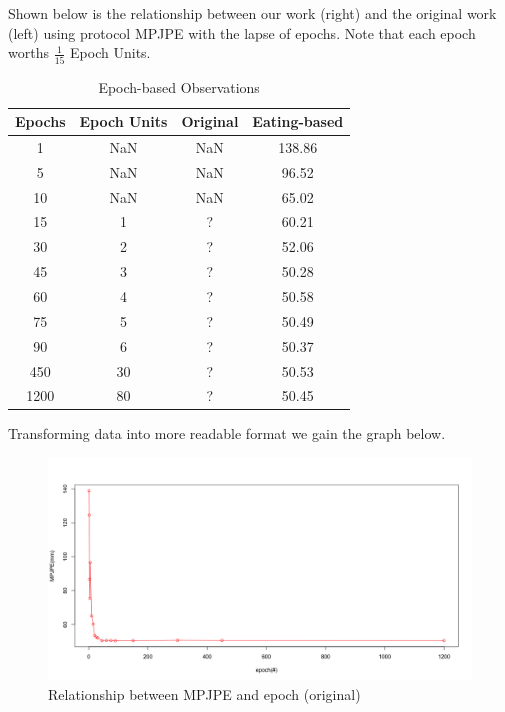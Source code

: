 \documentclass[10pt,twocolumn,letterpaper]{article}
\begin{document}
Shown below is the relationship between our work (right) and the original work (left) using protocol MPJPE with the
lapse of epochs.
Note that each epoch worths $\frac{1}{15}$ Epoch Units.

\begin{table}[H]
\caption{Epoch-based Observations}
\centering
\begin{tabular}{cccc}
\hline
Epochs & Epoch Units & Original & Eating-based\\
\hline

1& NaN & NaN & 138.86 \\
5& NaN & NaN & 96.52  \\
10& NaN & NaN & 65.02  \\
15& 1 & ? & 60.21 \\
30& 2 & ? & 52.06 \\
45& 3 & ? & 50.28  \\
60& 4 & ? & 50.58  \\
75& 5 & ? & 50.49  \\
90& 6 & ? & 50.37 \\
450& 30 & ? & 50.53 \\
1200& 80 & ? & 50.45 \\


\hline
\end{tabular}
\end{table}

Transforming data into more readable format we gain the graph below.

\begin{figure}[H]
	\begin{center}
  		\includegraphics[width=0.9\linewidth]{MPJPE_epoch_overall.png}
	\end{center}
   	\caption{Relationship between MPJPE and epoch (original)}
	\label{fig:long}
	\label{fig:onecol}
\end{figure}
\end{document}
